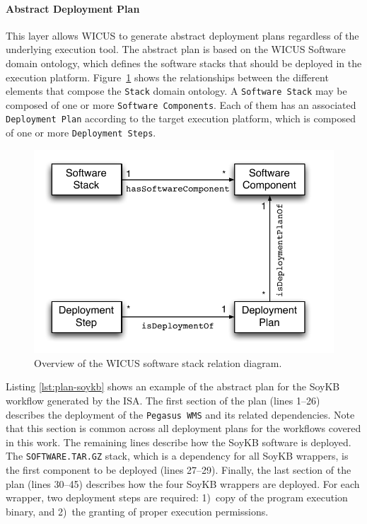 \paragraph{\textbf{Abstract Deployment Plan}}
This layer allows WICUS to generate abstract deployment plans regardless of the
underlying execution tool. The abstract plan is based on the WICUS Software~\cite{wicus} 
domain ontology, which defines the software stacks that should be deployed in the 
execution platform. Figure~\ref{fig:stack-rel} shows the relationships between the different
elements that compose the \texttt{Stack} domain ontology. A \texttt{Software Stack} may
be composed of one or more \texttt{Software Components}. Each of them has an associated 
\texttt{Deployment Plan} according to the target execution platform, which is composed of 
one or more \texttt{Deployment Steps}.

\begin{figure}[!htb]
	\centering
	\includegraphics[width=0.9\linewidth]{figures/stack-rel}
	\caption{Overview of the WICUS software stack relation diagram.}
	\label{fig:stack-rel}
\end{figure}

Listing \ref{lst:plan-soykb} shows an example of the abstract plan for the SoyKB workflow generated by the ISA. 
The first section of the plan (lines 1--26) describes the deployment of the \texttt{Pegasus 
WMS} and its related dependencies. Note that this section is common across all deployment
plans for the workflows covered in this work. The remaining lines describe how the SoyKB 
software is deployed. The \texttt{SOFTWARE.TAR.GZ} stack, which is a dependency for all 
SoyKB wrappers, is the first component to be deployed (lines 27--29). Finally, the last section 
of the plan (lines 30--45) describes how the four SoyKB wrappers are deployed. For each
wrapper, two deployment steps are required: 1)~copy of the program execution binary, and
2)~the granting of proper execution permissions.


